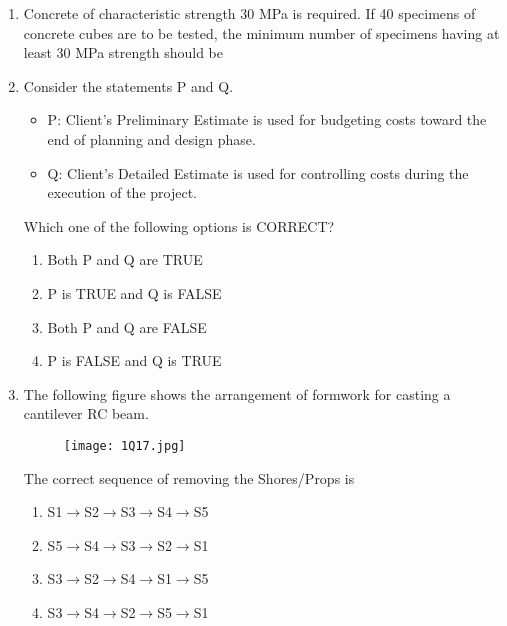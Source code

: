 \documentclass[journal,12pt,onecolumn]{article}
\theoremstyle{remark}
\begin{document}
\begin{enumerate}
    \item Concrete of characteristic strength 30 MPa is required. If 40 specimens of concrete cubes are to be tested, the minimum number of specimens having at least 30 MPa strength should be
    
    \hfill{}
    \begin{enumerate}
    \end{enumerate}

    \item Consider the statements P and Q.
    \begin{itemize}
    \item P: Client's Preliminary Estimate is used for budgeting costs toward the end of planning and design phase.
    \item Q: Client's Detailed Estimate is used for controlling costs during the execution of the project.
    \end{itemize}
    Which one of the following options is CORRECT?

    \hfill{}
    \begin{enumerate}
        \item Both P and Q are TRUE
        \item P is TRUE and Q is FALSE
        \item Both P and Q are FALSE
        \item P is FALSE and Q is TRUE
    \end{enumerate}

    \item The following figure  shows the arrangement of formwork for casting a cantilever RC beam.
    \begin{figure}[H]
        \centering
        \texttt{[image: 1Q17.jpg]}
        \caption{}
        \label{fig:q17}
    \end{figure}
    The correct sequence of removing the Shores/Props is

    \hfill{}
    \begin{enumerate}
        \item S1$\rightarrow$S2$\rightarrow$S3$\rightarrow$S4$\rightarrow$S5
        \item S5$\rightarrow$S4$\rightarrow$S3$\rightarrow$S2$\rightarrow$S1
        \item S3$\rightarrow$S2$\rightarrow$S4$\rightarrow$S1$\rightarrow$S5
        \item S3$\rightarrow$S4$\rightarrow$S2$\rightarrow$S5$\rightarrow$S1
    \end{enumerate}


\end{enumerate}
\end{document}
